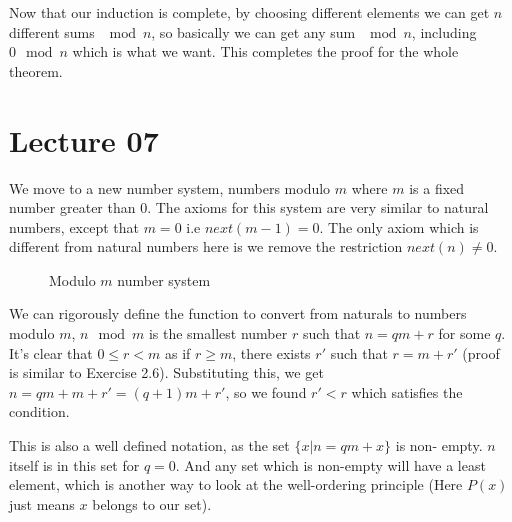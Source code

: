 \documentclass[a4paper,10pt]{article}
\theoremstyle{definition} %
\begin{document}
    Now that our induction is complete, by choosing different elements we can get
    $n$ different sums $\mod n$, so basically we can get any sum $\mod n$, including
    $0 \mod n$ which is what we want. This completes the proof for the whole theorem.

    \section{Lecture 07}

    We move to a new number system, numbers modulo $m$ where $m$ is a fixed number 
    greater than $0$. The axioms for this system are very similar to natural numbers,
    except that $m = 0$ i.e $next(m-1) = 0$. The only axiom which is different from
    natural numbers here is we remove the restriction $next(n) \neq 0$. 

    \begin{figure}[ht]
        \centering
        \caption{Modulo $m$ number system}
    \end{figure}

        We can rigorously define the function to convert from naturals to numbers 
        modulo $m$, $n \mod m$ is the smallest number $r$ such that $n = qm + r$
        for some $q$. It's clear that $0 \leq r < m$ as if $r \geq m$, there exists $r'$ 
        such that $r = m + r'$ (proof is similar to Exercise 2.6). Substituting this, 
        we get $n = qm + m + r' = (q+1)m + r'$, so we found $r' < r$ which satisfies 
        the condition.

        This is also a well defined notation, as the set $\{ x | n = qm + x\}$ is non-
        empty. $n$ itself is in this set for $q = 0$. And any set which is non-empty 
        will have a least element, which is another way to look at the well-ordering 
        principle (Here $P(x)$ just means $x$ belongs to our set).
\end{document}
